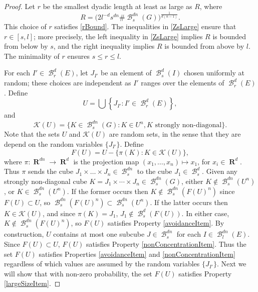 \documentclass[dvipsnames,letterpaper,12pt]{article}
\numberwithin{equation}{section}
\theoremstyle{plain}
\theoremstyle{remark}
\DeclareMathOperator{\RR}{\mathbf{R}}
\DeclareMathOperator{\B}{\mathcal{B}}
\begin{document}
\begin{proof}
	Let $r$ be the smallest dyadic length at least as large as $R$, where
	\begin{equation} \label{What-is-r}
		R = \big(2 l^{-d}s^{dn}\# \B^{dn}_s(G)\big)^{\frac{1}{d(n-1)}}.
	\end{equation} 
	This choice of $r$ satisfies \eqref{rBound}. 
	The inequalities in \eqref{ZsLarge} ensure that $r \in [s,l]$; more precisely, the left inequality in \eqref{ZsLarge} implies $R$ is bounded from below by $s$, and the right inequality implies $R$ is bounded from above by $l$. The minimality of $r$ ensures $s \leq r \leq l$.

	For each $I' \in \B_r^d(E)$, let $J_{I'}$ be an element of $\B^d_s(I)$ chosen uniformly at random; these choices are independent as $I'$ ranges over the elements of $\B_r^d(E)$. Define
	\[ 	U = \bigcup \left\{ J_{I'} \colon I' \in \B_r^d(E) \right\}, \]
	and
	\[ \mathcal{K}(U) = \{ K \in \B^{dn}_s(G) \colon K \in U^n, \text{$K$ strongly non-diagonal} \}. \]
	Note that the sets $U$ and $\mathcal{K}(U)$ are random sets, in the sense that they are depend on the random variables $\{ J_{I'} \}$. Define
	\begin{equation} \label{defnOfF}
		F(U) = U - \{ \pi(K) \colon K \in \mathcal{K}(U) \},
	\end{equation}
	where $\pi: \RR^{dn} \to \RR^d$ is the projection map $(x_1, \dots, x_n) \mapsto x_1$, for $x_i \in \RR^d$. Thus $\pi$ sends the cube $J_1 \times \dots \times J_n\in \B^{dn}_s$ to the cube $J_1 \in \B^d_s$. Given any strongly non-diagonal cube $K = J_1 \times \cdots \times J_n \in \B_s^{dn}(G)$, either $K \not \in \B_s^{dn}(U^n)$, or $K \in \B_s^{dn}(U^n)$. If the former occurs then $K \not \in \B_s^{dn}(F(U)^n)$ since $F(U) \subset U$, so $\B_s^{dn}(F(U)^n) \subset \B_s^{dn}(U^n)$. If the latter occurs then $K \in \mathcal{K}(U)$, and since $\pi(K) = J_1$, $J_1 \not \in \B_s^d(F(U))$. In either case, $K \not \in \B_s^{dn}(F(U)^n)$, so $F(U)$ satisfies Property \ref{avoidanceItem}. By construction, $U$ contains at most one subcube $J \in \B^{dn}_s$ for each $I \in \B^{dn}_l(E)$. Since $F(U) \subset U$, $F(U)$ satisfies Property \ref{nonConcentrationItem}. Thus the set $F(U)$ satisfies Properties \ref{avoidanceItem} and \ref{nonConcentrationItem} regardless of which values are assumed by the random variables $\{ J_{I'} \}$. Next we will show that with non-zero probability, the set $F(U)$ satisfies Property \ref{largeSizeItem}. 


\end{proof}
\end{document}
